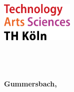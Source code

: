 \begin{titlepage}

\vspace*{-3.5cm}

\begin{flushleft}
\hspace*{-1cm} \includegraphics[width=3.5cm]{thkoeln-logo}
\end{flushleft}

\vspace{2.5cm}

\begin{center}
	\huge{
		\textbf{\thema} \\[4.5cm]
	}
	\Large{
		\textbf{\autorTitel}} \\[1.5cm]
		\large{
		\textbf{\studiengang} \\[8cm]
	}
	\large{
		\textbf{Gummersbach, \abgabedatum} \\[2.3cm]
	}
\end{center}

\end{titlepage}
